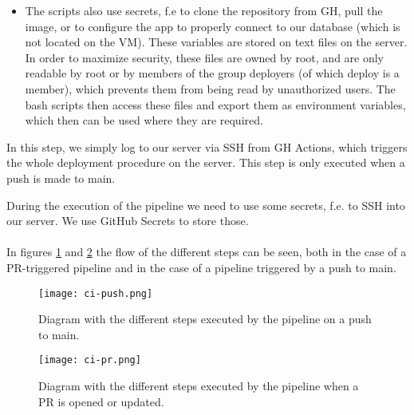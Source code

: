 \begin{enumerate}
\begin{itemize}
		\item The scripts also use secrets, f.e to clone the repository from GH, pull the image, or to configure the app to properly connect to our database (which is not located on the VM). These variables are stored on text files on the server. In order to maximize security, these files are owned by root, and are only readable by root or by members of the group deployers (of which deploy is a member), which prevents them from being read by unauthorized users. The bash scripts then access these files and export them as environment variables, which then can be used where they are required.
	\end{itemize}
	In this step, we simply log to our server via SSH from GH Actions, which triggers the whole deployment procedure on the server. This step is only executed when a push is made to main. 
\end{enumerate}
During the execution of the pipeline we need to use some secrets, f.e. to SSH into our server. We use GitHub Secrets to store those.

\paragraph{} In figures \ref{fig:ci-push} and \ref{fig:ci-pr} the flow of the different steps can be seen, both in the case of a PR-triggered pipeline and in the case of a pipeline triggered by a push to main.

\begin{figure}[h]
	\centering
	\texttt{[image: ci-push.png]}
	\caption{Diagram with the different steps executed by the pipeline on a push to main.}
	\label{fig:ci-push}
\end{figure}

\begin{figure}[h]
	\centering
	\texttt{[image: ci-pr.png]}
	\caption{Diagram with the different steps executed by the pipeline when a PR is opened or updated.}
	\label{fig:ci-pr}
\end{figure}
